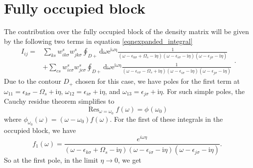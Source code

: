 \documentclass[12pt]{caltech_thesis}
\begin{document}
\section{Fully occupied block}
The contribution over the fully occupied block of the density matrix will be given by the following two terms in equation \ref{eqnexpanded_integral}
\begin{equation}
\begin{aligned}
I_{ij} =& \sum_{ks} w_{i k \sigma}^s w_{j k \sigma}^s \oint_{D+} \mathrm{d} \omega \mathrm{e}^{\mathrm{i \omega \eta}} \frac{1}{(\omega-\epsilon_{k \sigma}+\Omega_s-\mathrm{i} \eta)(\omega-\epsilon_{i \sigma}-\mathrm{i} \eta)(\omega-\epsilon_{j \sigma}-\mathrm{i} \eta)}\\
& + \sum_{cs} w_{i c \sigma}^s w_{j c \sigma}^s \oint_{D+} \mathrm{d} \omega \mathrm{e}^{\mathrm{i \omega \eta}} \frac{1}{(\omega-\epsilon_{c \sigma}-\Omega_s+\mathrm{i} \eta)(\omega-\epsilon_{i \sigma}-\mathrm{i} \eta)(\omega-\epsilon_{j \sigma}-\mathrm{i} \eta)}
\end{aligned}
.
\end{equation}
Due to the contour $D_+$ chosen for this case, we have poles for the first term at $\omega_{11} = \epsilon _{k\sigma } - \Omega _s + \mathrm{i} \eta$, $\omega_{12} = \epsilon _{i\sigma } + \mathrm{i} \eta$, and $\omega_{13} = \epsilon _{j\sigma } + \mathrm{i} \eta$. For such simple poles, the Cauchy residue theorem simplifies to
\begin{equation}
\operatorname{Res}_{\omega =\omega _0} f(\omega )= \phi^{}\left(\omega _0\right)
\label{eqncauchy_residue}
\end{equation}
where $\phi_{\omega _0}(\omega ) = (\omega - \omega_0) f(\omega )$. For the first of these integrals in the occupied block, we have
\begin{equation}
f_1(\omega) = \frac{e^{i\omega \eta }}{(\omega-\epsilon_{k \sigma}+\Omega_s-\mathrm{i} \eta)(\omega-\epsilon_{i \sigma}-\mathrm{i} \eta)(\omega-\epsilon_{j \sigma}-\mathrm{i} \eta)}.
\end{equation}
So at the first pole, in the limit $\eta \to 0$, we get
\end{document}
